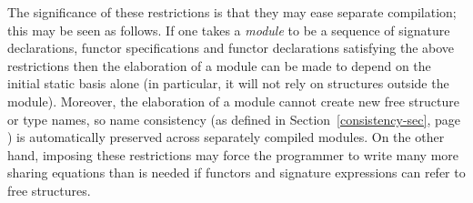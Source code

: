 {The
significance of these restrictions is that they may ease separate
compilation; this may be seen as follows. If one takes a {\sl module}
to be a sequence of signature declarations, functor specifications
and functor declarations satisfying the above restrictions then the
elaboration of a module can be made to depend on the initial
static basis alone (in particular, it will not rely on
structures outside the module). Moreover, the elaboration
of a module cannot create new free structure or type names, so
name consistency (as defined in Section~\ref{consistency-sec},
page \pageref{consistency-sec}) is automatically preserved
across separately compiled modules. On the other hand,
imposing these restrictions may force the programmer to write
many more sharing equations than is needed if functors
and signature expressions can refer to free structures.
}
